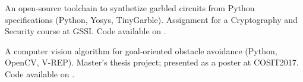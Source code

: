 \documentclass[a4paper]{deedy-resume-openfont}
\begin{document}
\begin{minipage}[t]{0.67\textwidth}
\begin{tightemize}
\item 
An open-source toolchain to synthetize garbled circuits from Python specifications (Python, Yosys, TinyGarble).
Assignment for a Cryptography and Security course at GSSI.
Code available on \href{https://github.com/lou1306/gssi/blob/master/2pc/}{}.
\item
A computer vision algorithm
for goal-oriented obstacle avoidance (Python, OpenCV, V-REP).
Master's thesis project; presented as a poster at COSIT2017. 
Code available on \href{https://github.com/lou1306/localpathplanner}{}.
\end{tightemize}

\end{minipage} 
\end{document}
